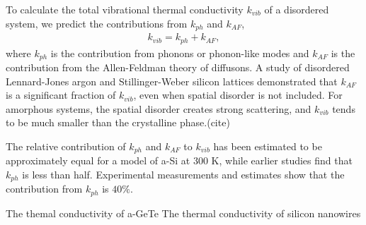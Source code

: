 \documentclass[aps,prb,twocolumn,superscriptaddress,footinbib,amsmath,amssymb,floatfix]{revtex4}
\begin{document}
To calculate the total vibrational thermal conductivity $k_{vib}$ of a 
disordered system, we predict 
the contributions from $k_{ph}$ and $k_{AF}$, 
\begin{equation}\label{EQ:kvib}
\begin{split}
k_{vib} = k_{ph} + k_{AF},
\end{split}
\end{equation}
where $k_{ph}$\cite{ashcroft} is the contribution from phonons or 
phonon-like modes and $k_{AF}$ is the contribution from the 
Allen-Feldman theory of diffusons.
\cite{feldman_thermal_1993,feldman_numerical_1999}
A study of disordered Lennard-Jones argon and Stillinger-Weber silicon 
lattices demonstrated that $k_{AF}$ is a significant fraction of $k_{vib}$, 
even when spatial disorder is not included. 
For amorphous systems, the 
spatial disorder creates strong scattering, and $k_{vib}$ tends to be 
much smaller than the crystalline phase.(cite)  

The relative contribution of $k_{ph}$ and $k_{AF}$ to $k_{vib}$ 
has been estimated 
to be approximately equal for a model of a-Si  
at 300 K,\cite{he_heat_2011} 
while earlier studies find that $k_{ph}$ is less than half.
\cite{feldman_thermal_1993,feldman_numerical_1999} Experimental 
measurements and estimates show that the contribution from 
$k_{ph}$ is $40\%$.\cite{liu_high_2009} 

The themal conductivity of a-GeTe \cite{sosso_thermal_2012}
The thermal conductivity of silicon nanowires \cite{donadio_atomistic_2009}
\end{document}
